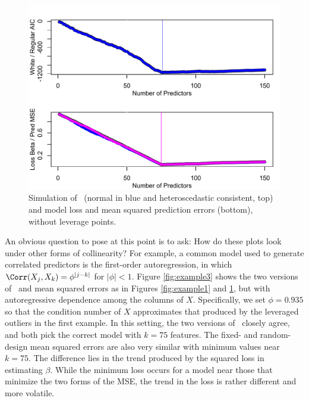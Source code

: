 \documentclass[12pt]{article}
\begin{document}
 \begin{figure}
 \caption{ Simulation of \aic\ (normal in blue and heteroscedastic consistent,
 top) and model loss and mean squared prediction errors (bottom), without
leverage points. }
 \label{fig:example2}
  \centerline{ \includegraphics[width=5in]{figures/leverage/example2.pdf} }
 \end{figure}



 An obvious question to pose at this point is to ask: How do these plots look
 under other forms of collinearity?  For example, a common model used to
 generate correlated predictors is the first-order autoregression, in which
 $\Corr(X_j,X_k) = \phi^{|j-k|}$ for $|\phi| < 1$.  Figure \ref{fig:example3}
 shows the two versions of \aic\ and mean squared errors as in Figures
 \ref{fig:example1} and \ref{fig:example2}, but with autoregressive dependence
 among the columns of $X$.  Specifically, we set $\phi=0.935$ so that the
 condition number of $X$ approximates that produced by the leveraged outliers in
 the first example.  In this setting, the two versions of \aic\ closely agree,
 and both pick the correct model with $k = 75$ features.  The fixed- and
 random-design mean squared errors are also very similar with minimum values
 near $k=75$.  The difference lies in the trend produced by the squared loss in
 estimating $\beta$.  While the minimum loss occurs for a model near those that
 minimize the two forms of the MSE, the trend in the loss is rather different
 and more volatile.
\end{document}
